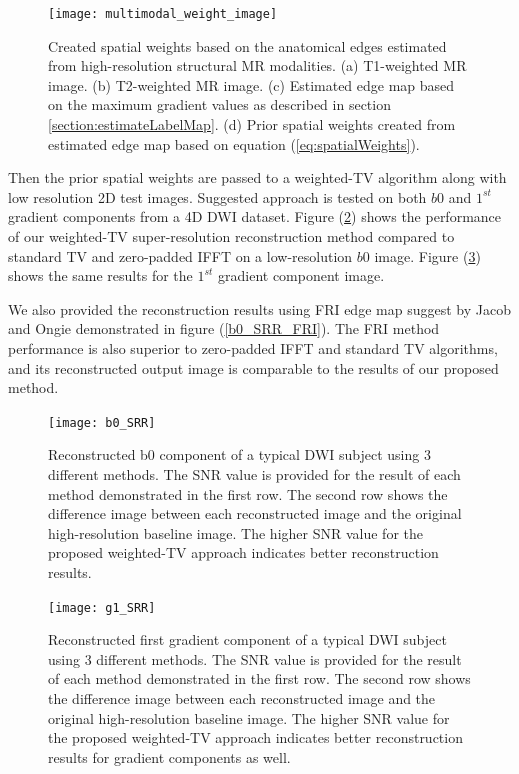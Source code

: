 \begin{figure}[ht]
\centering
\texttt{[image: multimodal\_weight\_image]}\
\centering
\caption{Created spatial weights based on the anatomical edges estimated from high-resolution structural MR modalities. (a) T1-weighted MR image. (b) T2-weighted MR image. (c) Estimated edge map based on the maximum gradient values as described in section \ref{section:estimateLabelMap}. (d) Prior spatial weights created from estimated edge map based on equation (\ref{eq:spatialWeights}).}
\label{multimodal_wight_image}
\end{figure}

Then the prior spatial weights are passed to a weighted-TV algorithm along with low resolution 2D test images.
Suggested approach is tested on both $b0$ and $1^{st}$ gradient components from a 4D DWI dataset.
Figure (\ref{b0_SRR}) shows the performance of our weighted-TV super-resolution reconstruction method compared to standard TV and zero-padded IFFT on a low-resolution $b0$ image.
Figure (\ref{g1_SRR}) shows the same results for the $1^{st}$ gradient component image.

We also provided the reconstruction results using FRI edge map suggest by Jacob and Ongie \cite{ongie2015} demonstrated in figure (\ref{b0_SRR_FRI}). The FRI method performance is also superior to zero-padded IFFT and standard TV algorithms, and its reconstructed output image is comparable to the results of our proposed method.

\begin{figure}[ht]
\centering
\texttt{[image: b0\_SRR]}\
\centering
\caption{Reconstructed b0 component of a typical DWI subject using 3 different methods. The SNR value is provided for the result of each method demonstrated in the first row. The second row shows the difference image between each reconstructed image and the original high-resolution baseline image. The higher SNR value for the proposed weighted-TV approach indicates better reconstruction results.}
\label{b0_SRR}
\end{figure}

\begin{figure}[ht]
\centering
\texttt{[image: g1\_SRR]}\
\centering
\caption{Reconstructed first gradient component of a typical DWI subject using 3 different methods. The SNR value is provided for the result of each method demonstrated in the first row. The second row shows the difference image between each reconstructed image and the original high-resolution baseline image. The higher SNR value for the proposed weighted-TV approach indicates better reconstruction results for gradient components as well.}
\label{g1_SRR}
\end{figure}

